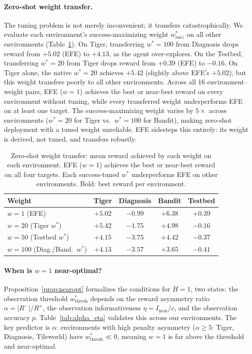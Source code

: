 \documentclass[runningheads]{llncs}
\begin{document}
\paragraph{Zero-shot weight transfer.}
The tuning problem is not merely inconvenient; it transfers catastrophically. We evaluate each environment's success-maximizing weight $w^*_{\text{succ}}$ on all other environments (Table~\ref{tab:transfer}). On Tiger, transferring $w^*{=}100$ from Diagnosis drops reward from $+5.02$ (EFE) to $+4.13$, as the agent over-explores. On the Testbed, transferring $w^*{=}20$ from Tiger drops reward from $+0.39$ (EFE) to $-0.16$. On Tiger alone, the native $w^*{=}20$ achieves $+5.42$ (slightly above EFE's $+5.02$), but this weight transfers poorly to all other environments. Across all 16 environment--weight pairs, EFE ($w{=}1$) achieves the best or near-best reward on every environment without tuning, while every transferred weight underperforms EFE on at least one target. The success-maximizing weight varies by $5\times$ across environments ($w^*{=}20$ for Tiger vs.\ $w^*{=}100$ for Bandit), making zero-shot deployment with a tuned weight unreliable. EFE sidesteps this entirely: its weight is derived, not tuned, and transfers robustly.

\begin{table}[ht]
\centering
\caption{Zero-shot weight transfer: mean reward achieved by each weight on each environment. EFE ($w{=}1$) achieves the best or near-best reward on all four targets. Each success-tuned $w^*$ underperforms EFE on other environments. Bold: best reward per environment.}
\label{tab:transfer}
\begin{small}
\begin{tabular}{lcccc}
\toprule
Weight & Tiger & Diagnosis & Bandit & Testbed \\
\midrule
$w{=}1$ (EFE) & $+5.02$ & $\mathbf{-0.99}$ & $\mathbf{+6.38}$ & $\mathbf{+0.39}$ \\
$w{=}20$ (Tiger $w^*$) & $\mathbf{+5.42}$ & $-1.75$ & $+4.98$ & $-0.16$ \\
$w{=}50$ (Testbed $w^*$) & $+4.15$ & $-3.75$ & $+4.42$ & $-0.37$ \\
$w{=}100$ (Diag./Band.\ $w^*$) & $+4.13$ & $-3.57$ & $+3.65$ & $-0.41$ \\
\bottomrule
\end{tabular}
\end{small}
\end{table}

\paragraph{When is $w{=}1$ near-optimal?}
Proposition~\ref{prop:nearopt} formalizes the conditions for $H{=}1$, two states: the observation threshold $w^*_{\text{thresh}}$ depends on the reward asymmetry ratio $\alpha = |R^-|/R^+$, the observation informativeness $\eta = I_{\max}/c$, and the observation accuracy $p$. Table~\ref{tab:alpha_eta} validates this across our environments. The key predictor is $\alpha$: environments with high penalty asymmetry ($\alpha \geq 5$: Tiger, Diagnosis, Tileworld) have $w^*_{\text{thresh}} \ll 0$, meaning $w{=}1$ is far above the threshold and near-optimal.
\end{document}
